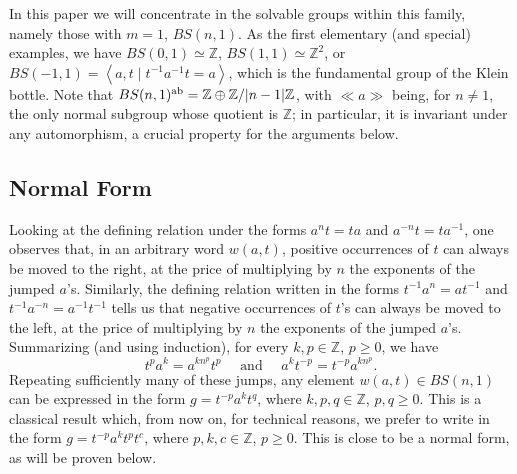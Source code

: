 \documentclass[english]{amsart}
\theoremstyle{definition}
\newcommand\ZZ{\mathbb{Z}}
\newcommand{\pres}[2]{\left\langle#1 \mid #2\right\rangle}
\newcommand{\ncl}[1]{\ll \!#1 \!\gg}
\begin{document}
In this paper we will concentrate in the solvable groups within this family, namely those with $m=1$, $BS(n,1)$. As the first elementary (and special) examples, we have $BS(0,1)\simeq \ZZ$, $BS(1,1)\simeq \ZZ^2$, or $BS(-1,1)=\pres{a,t}{t^{-1}a^{-1}t=a}$, which is the fundamental group of the Klein bottle. Note that $BS(n,1)^{\rm ab}=\ZZ \oplus \ZZ/|n-1|\ZZ$, with $\ncl{a}$ being, for $n\neq 1$, the only normal subgroup whose quotient is $\ZZ$; in particular, it is invariant under any automorphism, a crucial property for the arguments below.

\subsection{Normal Form}

Looking at the defining relation under the forms $a^n t=ta$ and $a^{-n}t=ta^{-1}$, one observes that, in an arbitrary word $w(a,t)$, positive occurrences of $t$ can always be moved to the right, at the price of multiplying by $n$ the exponents of the jumped $a$'s. Similarly, the defining relation written in the forms $t^{-1}a^n =at^{-1}$ and $t^{-1}a^{-n}=a^{-1}t^{-1}$ tells us that negative occurrences of $t$'s can always be moved to the left, at the price of multiplying by $n$ the exponents of the jumped $a$'s. Summarizing (and using induction), for every $k,p\in \ZZ$, $p\geq 0$, we have 
 \begin{equation}\label{eq: jumps}
t^p a^k =a^{kn^p}t^p \quad \text{ and } \quad a^k t^{-p}=t^{-p}a^{kn^p}.
 \end{equation}
Repeating sufficiently many of these jumps, any element $w(a,t)\in BS(n,1)$ can be expressed in the form $g=t^{-p}a^k t^q$, where $k,p,q\in \ZZ$, $p,q\geq 0$. This is a classical result which, from now on, for technical reasons, we prefer to write in the form $g=t^{-p}a^k t^p t^c$, where $p,k, c\in \ZZ$, $p\geq 0$. This is close to be a normal form, as will be proven below.

%
\end{document}
